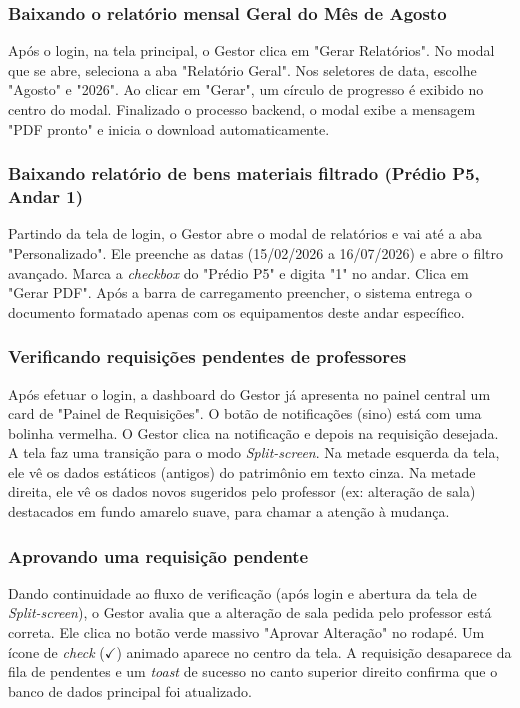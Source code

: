 \documentclass[12pt,a4paper]{article}
\begin{document}
\subsubsection{Baixando o relatório mensal Geral do Mês de Agosto}
Após o login, na tela principal, o Gestor clica em "Gerar Relatórios". No modal que se abre, seleciona a aba "Relatório Geral". Nos seletores de data, escolhe "Agosto" e "2026". Ao clicar em "Gerar", um círculo de progresso é exibido no centro do modal. Finalizado o processo backend, o modal exibe a mensagem "PDF pronto" e inicia o download automaticamente.

\subsubsection{Baixando relatório de bens materiais filtrado (Prédio P5, Andar 1)}
Partindo da tela de login, o Gestor abre o modal de relatórios e vai até a aba "Personalizado". Ele preenche as datas (15/02/2026 a 16/07/2026) e abre o filtro avançado. Marca a \textit{checkbox} do "Prédio P5" e digita "1" no andar. Clica em "Gerar PDF". Após a barra de carregamento preencher, o sistema entrega o documento formatado apenas com os equipamentos deste andar específico.

\subsubsection{Verificando requisições pendentes de professores}
Após efetuar o login, a dashboard do Gestor já apresenta no painel central um card de "Painel de Requisições". O botão de notificações (sino) está com uma bolinha vermelha. O Gestor clica na notificação e depois na requisição desejada. A tela faz uma transição para o modo \textit{Split-screen}. Na metade esquerda da tela, ele vê os dados estáticos (antigos) do patrimônio em texto cinza. Na metade direita, ele vê os dados novos sugeridos pelo professor (ex: alteração de sala) destacados em fundo amarelo suave, para chamar a atenção à mudança.

\subsubsection{Aprovando uma requisição pendente}
Dando continuidade ao fluxo de verificação (após login e abertura da tela de \textit{Split-screen}), o Gestor avalia que a alteração de sala pedida pelo professor está correta. Ele clica no botão verde massivo "Aprovar Alteração" no rodapé. Um ícone de \textit{check} ($\checkmark$) animado aparece no centro da tela. A requisição desaparece da fila de pendentes e um \textit{toast} de sucesso no canto superior direito confirma que o banco de dados principal foi atualizado.
\end{document}
